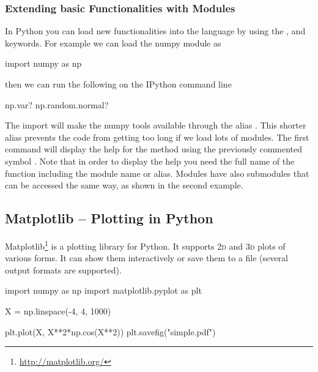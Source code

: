 \subsubsection{Extending basic Functionalities with Modules}

In Python you can load new functionalities into the language by using the ,  and  keywords. For example we can load the numpy module as

\begin{python}
import numpy as np
\end{python}

then we can run the following on the IPython command line

\begin{python}
np.var?
np.random.normal?
\end{python}

The import  will make the numpy tools available through the alias . This shorter alias prevents the code from getting too long if we load lots of modules. The first command will display the help for the method  using the previously commented symbol . Note that in order to display the help you need the full name of the function including the module name or alias. Modules have also submodules that can be accessed the same way, as shown in the second example.


\subsection{Matplotlib -- Plotting in Python}

Matplotlib\footnote{\url{http://matplotlib.org/}} is a plotting library for Python. It supports \textsc{2d} and \textsc{3d} plots of various forms. It can show them interactively or save them to a file (several output formats are supported).

\begin{python}
import numpy as np
import matplotlib.pyplot as plt

X = np.linspace(-4, 4, 1000)

plt.plot(X, X**2*np.cos(X**2))
plt.savefig("simple.pdf")
\end{python}


